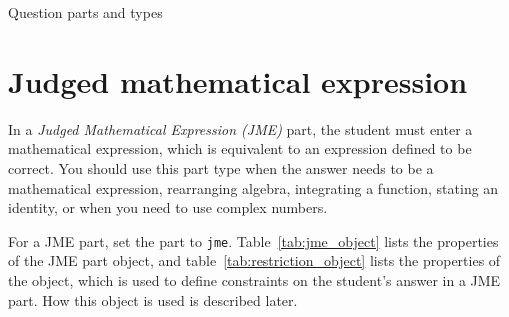 \begin{chapter}{\label{cha:question_parts}Question parts and types}
  \section{\label{sec:jme_part}Judged mathematical expression}
  In a \emph{Judged Mathematical Expression (JME)} part, the student must enter
  a mathematical expression, which is equivalent to an expression defined to be
  correct.  You should use this part type when the answer needs to be a
  mathematical expression, \eg rearranging algebra, integrating a function,
  stating an identity, or when you need to use complex numbers.

  For a JME part, set the part  to \verb"jme".
  Table~\ref{tab:jme_object} lists the properties of the JME part object, and
  table~\ref{tab:restriction_object} lists the properties of the
   object, which is used to define constraints on the
  student's answer in a JME part.  How this object is used is described later.


\end{chapter}
